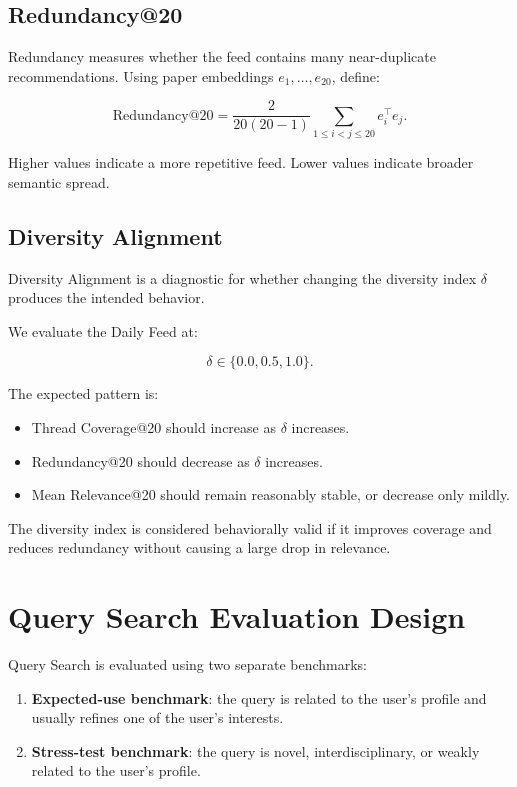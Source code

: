 \documentclass[11pt]{article}
\begin{document}
\subsection{Redundancy@20}

Redundancy measures whether the feed contains many near-duplicate recommendations. Using paper embeddings $e_1,\ldots,e_{20}$, define:

\[
\text{Redundancy@20}
=
\frac{2}{20(20-1)}
\sum_{1 \leq i < j \leq 20}
e_i^\top e_j.
\]

Higher values indicate a more repetitive feed. Lower values indicate broader semantic spread.

\subsection{Diversity Alignment}

Diversity Alignment is a diagnostic for whether changing the diversity index $\delta$ produces the intended behavior.

We evaluate the Daily Feed at:

\[
\delta \in \{0.0, 0.5, 1.0\}.
\]

The expected pattern is:

\begin{itemize}[leftmargin=*]
    \item Thread Coverage@20 should increase as $\delta$ increases.
    \item Redundancy@20 should decrease as $\delta$ increases.
    \item Mean Relevance@20 should remain reasonably stable, or decrease only mildly.
\end{itemize}

The diversity index is considered behaviorally valid if it improves coverage and reduces redundancy without causing a large drop in relevance.

\section{Query Search Evaluation Design}

Query Search is evaluated using two separate benchmarks:

\begin{enumerate}[leftmargin=*]
    \item \textbf{Expected-use benchmark}: the query is related to the user's profile and usually refines one of the user's interests.
    \item \textbf{Stress-test benchmark}: the query is novel, interdisciplinary, or weakly related to the user's profile.
\end{enumerate}
\end{document}
